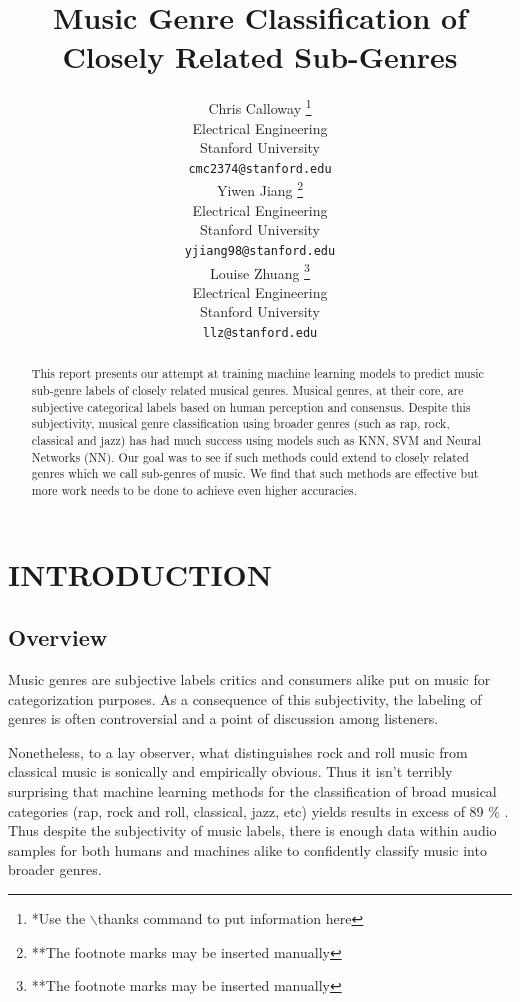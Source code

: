 \documentclass[letterpaper, 12 pt, conference]{ieeeconf}  %
\title{\LARGE \bf
Music Genre Classification of Closely Related Sub-Genres 
}
\author{ \parbox{2 in}{\centering Chris Calloway
        \thanks{*Use the $\backslash$thanks command to put information here}\\
        Electrical Engineering\\
       Stanford University\\
        {\tt\small cmc2374@stanford.edu}}
        \hspace*{ 0.5 in}
        \parbox{2 in}{ \centering Yiwen Jiang
        \thanks{**The footnote marks may be inserted manually}\\
        Electrical Engineering \\
        Stanford University\\
        {\tt\small yjiang98@stanford.edu}}
          \hspace*{ 0.5 in}
        \parbox{2 in}{ \centering Louise Zhuang
        \thanks{**The footnote marks may be inserted manually}\\
        Electrical Engineering \\
        Stanford University\\
        {\tt\small llz@stanford.edu}}
}
\begin{document}
\maketitle
\thispagestyle{empty}
\pagestyle{empty}


\begin{abstract}

This report presents our attempt at training machine learning models to predict music sub-genre labels of closely related musical genres. Musical genres, at their core, are subjective categorical labels based on human perception and consensus. Despite this subjectivity, musical genre classification using broader genres (such as rap, rock, classical and jazz) has had much success using models such as KNN, SVM and Neural Networks (NN). Our goal was to see if such methods could extend to closely related genres  which we call sub-genres of music. We find that such methods are effective but more work needs to be done to achieve even higher accuracies. 




\end{abstract}


\section{INTRODUCTION}

\subsection{Overview}

Music genres are subjective labels critics and consumers alike put on music for categorization purposes. 
As a consequence of this subjectivity, the labeling of genres is often controversial and a point of discussion among listeners. 

Nonetheless, to a lay observer, what distinguishes rock and roll music from classical music is sonically and empirically obvious. Thus it isn't terribly surprising that machine learning methods for the classification of broad musical categories (rap, rock and roll, classical, jazz, etc) yields results in excess of 89 \% \cite{c1} \cite{c2} \cite{c3}. Thus despite the subjectivity of music labels, there is enough data within audio samples for both humans and machines alike to confidently classify music into broader genres.
\end{document}
